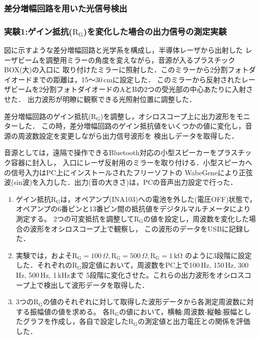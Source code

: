 \documentclass{ltjsarticle}
\begin{document}
		\subsubsection{差分増幅回路を用いた光信号検出}
			\subsubsection{実験1:ゲイン抵抗($\mathrm{R_G}$)を変化した場合の出力信号の測定実験}
				
				図に示すような差分増幅回路と光学系を構成し，半導体レーザから出射した
				レーザビームを調整用ミラーの角度を変えながら，音源が入るプラスチックBOX(大)の入口に
				取り付けたミラーに照射した．このミラーから2分割フォトダイオードまでの距離は，15～30\,cmに設定した．
				このミラーから反射されたレーザビームを2分割フォトダイオードのAとBの2つの受光部の中心あたりに入射させた．
				出力波形が明瞭に観察できる光照射位置に調整した．

				差分増幅回路のゲイン抵抗($\mathrm{R_G}$)を調整し，オシロスコープ上に出力波形をモニターした．
				この時，差分増幅回路のゲイン抵抗値をいくつかの値に変化し，音源の周波数設定を変更しながら出力信号波形を
				検出しデータを取得した．

				音源としては，遠隔で操作できるBluetooth対応の小型スピーカーをプラスチック容器に封入し，
				入口にレーザ反射用のミラーを取り付ける．小型スピーカへの信号入力はPC上にインストールされたフリーソフトの
				WabeGeneにより正弦波(sin波)を入力した．出力(音の大きさ)は，PCの音声出力設定で行った．

				\begin{enumerate}
					\item ゲイン抵抗$\mathrm{R_G}$は，オペアンプ(INA103)への電池を外した(電圧OFF)状態で，
						オペアンプの6番ピンと13番ピン間の抵抗値をデジタルマルチメータにより測定する。
						2つの可変抵抗を調整して$\mathrm{R_G}$の値を設定し，周波数を変化した場合の波形をオシロスコープ上で観察し，
						この波形のデータをUSBに記録した．
					\item 実験では，およそ$\mathrm{R_G} = 100\,\Omega, \mathrm{R_G} = 500\,\Omega, \mathrm{R_G} = 1\,\mathrm{k\Omega}$
						のように3段階に設定した．それぞれの$\mathrm{R_G}$設定値において，周波数をPC上で100\,Hz, 150\,Hz, 300\,Hz, 500\,Hz, 1\,kHzまで
						5段階に変化させた。これらの出力波形をオシロスコープ上で検出して波形データを取得した．
					\item 3つの$\mathrm{R_G}$の値のそれぞれに対して取得した波形データから各測定周波数に対する振幅値の値を求める。
						各$\mathrm{R_G}$の値において，横軸:周波数-縦軸:振幅としたグラフを作成し，各自で設定した$\mathrm{R_G}$の測定値と出力電圧との関係を評価した．
				\end{enumerate}
\end{document}
